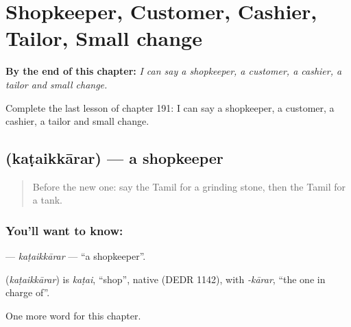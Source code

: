 
\chapter{Shopkeeper, Customer, Cashier, Tailor, Small change}
\label{ch:ta-shopkeeper-customer-cashier-tailor-small-change}

\begin{chapteropening}
\textbf{By the end of this chapter:} \emph{I can say a shopkeeper, a customer, a cashier, a tailor and small change.}

Complete the last lesson of chapter 191: I can say a shopkeeper, a customer, a cashier, a tailor and small change.
\end{chapteropening}

\section[\texorpdfstring{\ta{கடைக்காரர்} (kaṭaikkārar)}{கடைக்காரர் (kaṭaikkārar)}]{ (kaṭaikkārar) — a shopkeeper}

\label{lesson:TA-C191-kataikkarar}



\begin{quote}
Before the new one: say the Tamil for a grinding stone, then the Tamil for a tank.
\end{quote}

\subsection*{You'll want to know: }
\textbf{} — \emph{kaṭaikkārar} — \textquotedblleft{}a shopkeeper\textquotedblright{}.

\begin{cousinweb}
\textbf{} (\emph{kaṭaikkārar}) is \emph{kaṭai}, \textquotedblleft{}shop\textquotedblright{}, native (DEDR 1142), with \emph{-kārar}, \textquotedblleft{}the one in charge of\textquotedblright{}.
\end{cousinweb}

\begin{grammarlens}[title={What you've built}]
One more word for this chapter.
\end{grammarlens}

